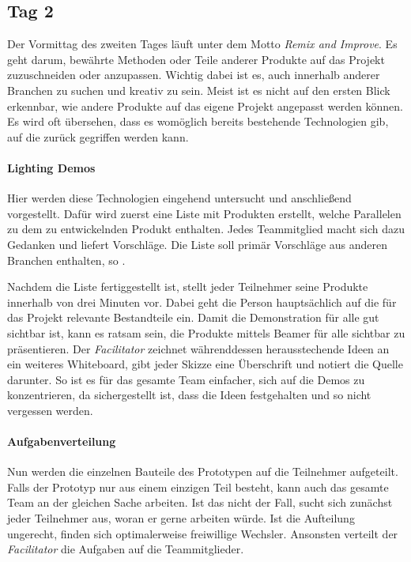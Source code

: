 \subsection*{\label{sec:Sprint-Tag2}\thesubsection\quad Tag 2}
Der Vormittag des zweiten Tages läuft unter dem Motto \textit{Remix and Improve}. Es geht darum, bewährte Methoden oder Teile anderer Produkte auf das Projekt zuzuschneiden oder anzupassen. Wichtig dabei ist es, auch innerhalb anderer Branchen zu suchen und kreativ zu sein. Meist ist es nicht auf den ersten Blick erkennbar, wie andere Produkte auf das eigene Projekt angepasst werden können. Es wird oft übersehen, dass es womöglich bereits bestehende Technologien gib, auf die zurück gegriffen werden kann.

\paragraph{Lighting Demos}
\label{sec:Sprint-Tag2-Demos}
Hier werden diese Technologien eingehend untersucht und anschließend vorgestellt. Dafür wird zuerst eine Liste mit Produkten erstellt, welche Parallelen zu dem zu entwickelnden Produkt enthalten. Jedes Teammitglied macht sich dazu Gedanken und liefert Vorschläge. Die Liste soll primär Vorschläge aus anderen Branchen enthalten, so \citeauthor{Sprint}.

Nachdem die Liste fertiggestellt ist, stellt jeder Teilnehmer seine Produkte innerhalb von drei Minuten vor. Dabei geht die Person hauptsächlich auf die für das Projekt relevante Bestandteile ein. Damit die Demonstration für alle gut sichtbar ist, kann es ratsam sein, die Produkte mittels Beamer für alle sichtbar zu präsentieren. Der \textit{Facilitator} zeichnet währenddessen herausstechende Ideen an ein weiteres Whiteboard, gibt jeder Skizze eine Überschrift und notiert die Quelle darunter. So ist es für das gesamte Team einfacher, sich auf die Demos zu konzentrieren, da sichergestellt ist, dass die Ideen festgehalten und so nicht vergessen werden.

\paragraph{Aufgabenverteilung}
\label{sec:Sprint-Tag2-Verteilung}
Nun werden die einzelnen Bauteile des Prototypen auf die Teilnehmer aufgeteilt. Falls der Prototyp nur aus einem einzigen Teil besteht, kann auch das gesamte Team an der gleichen Sache arbeiten. Ist das nicht der Fall, sucht sich zunächst jeder Teilnehmer aus, woran er gerne arbeiten würde. Ist die Aufteilung ungerecht, finden sich optimalerweise freiwillige Wechsler. Ansonsten verteilt der \textit{Facilitator} die Aufgaben auf die Teammitglieder.

